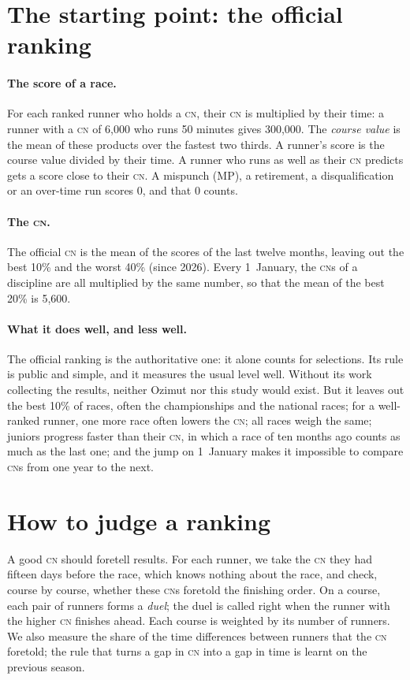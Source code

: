 \documentclass[11pt,a4paper]{article}
\newcommand{\CN}{\textsc{cn}}
\begin{document}
\section{The starting point: the official ranking}

\paragraph{The score of a race.} For each ranked runner who holds a \CN, their \CN{} is multiplied by their time: a runner with a \CN{} of 6,000 who runs 50 minutes gives 300,000. The \emph{course value} is the mean of these products over the fastest two thirds. A runner's score is the course value divided by their time. A runner who runs as well as their \CN{} predicts gets a score close to their \CN. A mispunch (MP), a retirement, a disqualification or an over-time run scores 0, and that 0 counts.

\paragraph{The \CN.} The official \CN{} is the mean of the scores of the last twelve months, leaving out the best 10\% and the worst 40\% (since 2026). Every 1~January, the \CN s of a discipline are all multiplied by the same number, so that the mean of the best 20\% is 5,600.

\paragraph{What it does well, and less well.} The official ranking is the authoritative one: it alone counts for selections. Its rule is public and simple, and it measures the usual level well. Without its work collecting the results, neither Ozimut nor this study would exist. But it leaves out the best 10\% of races, often the championships and the national races; for a well-ranked runner, one more race often lowers the \CN; all races weigh the same; juniors progress faster than their \CN, in which a race of ten months ago counts as much as the last one; and the jump on 1~January makes it impossible to compare \CN s from one year to the next.

\section{How to judge a ranking}

A good \CN{} should foretell results. For each runner, we take the \CN{} they had fifteen days before the race, which knows nothing about the race, and check, course by course, whether these \CN s foretold the finishing order. On a course, each pair of runners forms a \emph{duel}; the duel is called right when the runner with the higher \CN{} finishes ahead. Each course is weighted by its number of runners. We also measure the share of the time differences between runners that the \CN{} foretold; the rule that turns a gap in \CN{} into a gap in time is learnt on the previous season.
\end{document}
